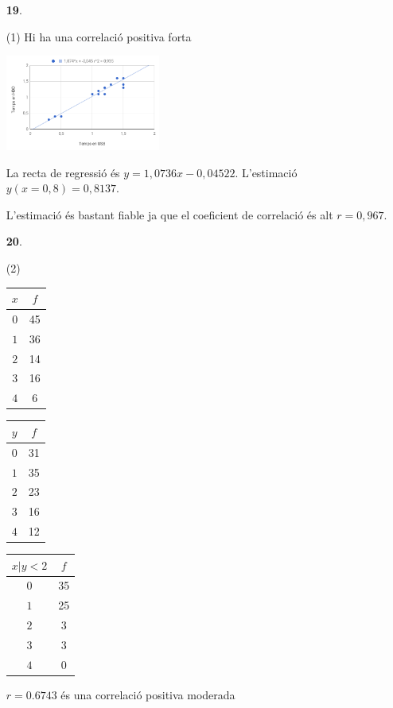 \documentclass[a4paper, pdf, twoside]{book}
\begin{document}
\begin{multicols}{2}
\begin{enumerate}

 \item[\fontfamily{phv}\selectfont\color{blue}\textbf{19}. ] 
 \begin{tasks}[column-sep=1em, item-indent=1.3333em](1)
	 \task* Hi ha una correlació positiva forta\par \includegraphics [width=0.4\textwidth ]{img-sol/t11-19}\par {} 
	 \task* La recta de regressió és $y=1,0736 x -0,04522$. L'estimació $y(x=0,8)=0,8137$.\par L'estimació és bastant fiable ja que el coeficient de correlació és alt $r=0,967$. 
\end{tasks}
\vspace{0.25cm}



 \item[\fontfamily{phv}\selectfont\color{blue}\textbf{20}. ] 
 \begin{tasks}[column-sep=1em, item-indent=1.3333em](2)
	 \task* \begin {tabular}{|c|c|}\hline \rowcolor {lightgray} $x$ & $f$ \\\hline $0$ & 45\\ \hline $1$ & 36\\ \hline $2$ & 14\\ \hline $3$ & 16\\ \hline $4$ & 6\\ \hline \end {tabular} \hspace {0.25cm} \begin {tabular}{|c|c|}\hline \rowcolor {lightgray} $y$ & $f$ \\\hline $0$ & 31\\ \hline $1$ & 35\\ \hline $2$ & 23\\ \hline $3$ & 16\\ \hline $4$ & 12\\ \hline \end {tabular}
	 \task* \begin {tabular}{|c|c|}\hline \rowcolor {lightgray} $x | y<2$ & $f$ \\\hline $0$ & 35\\ \hline $1$ & 25\\ \hline $2$ & 3\\ \hline $3$ & 3\\ \hline $4$ & 0\\ \hline \end {tabular}
	 \task* $r=0.6743$ és una correlació positiva moderada \par {} 
\end{tasks}
\vspace{0.25cm}



\end{enumerate}
\end{multicols}
\end{document}
